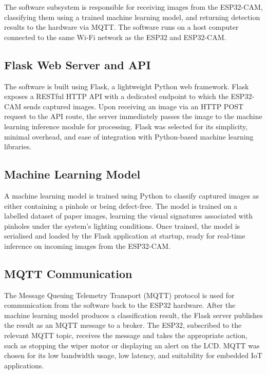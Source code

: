 The software subsystem is responsible for receiving images from the ESP32-CAM, classifying them using a trained machine learning model, and returning detection results to the hardware via MQTT. The software runs on a host computer connected to the same Wi-Fi network as the ESP32 and ESP32-CAM.

\subsection{Flask Web Server and API}

The software is built using Flask, a lightweight Python web framework. Flask exposes a RESTful HTTP API with a dedicated endpoint to which the ESP32-CAM sends captured images. Upon receiving an image via an HTTP POST request to the API route, the server immediately passes the image to the machine learning inference module for processing. Flask was selected for its simplicity, minimal overhead, and ease of integration with Python-based machine learning libraries.

\subsection{Machine Learning Model}

A machine learning model is trained using Python to classify captured images as either containing a pinhole or being defect-free. The model is trained on a labelled dataset of paper images, learning the visual signatures associated with pinholes under the system's lighting conditions. Once trained, the model is serialised and loaded by the Flask application at startup, ready for real-time inference on incoming images from the ESP32-CAM.

\subsection{MQTT Communication}

The Message Queuing Telemetry Transport (MQTT) protocol is used for communication from the software back to the ESP32 hardware. After the machine learning model produces a classification result, the Flask server publishes the result as an MQTT message to a broker. The ESP32, subscribed to the relevant MQTT topic, receives the message and takes the appropriate action, such as stopping the wiper motor or displaying an alert on the LCD. MQTT was chosen for its low bandwidth usage, low latency, and suitability for embedded IoT applications.

